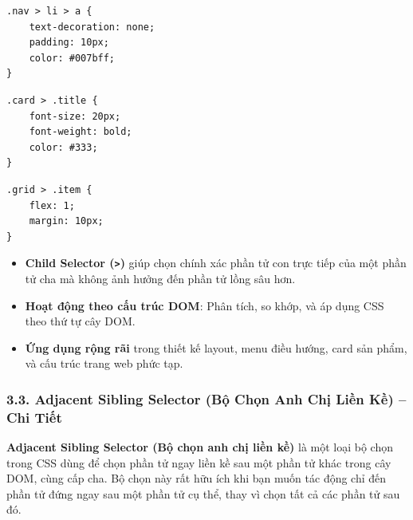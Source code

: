 \documentclass[11pt,oneside]{book}
\newcommand{\codeinline}[1]{\textcolor{accentOrange}{\texttt{#1}}}
\begin{document}
\begin{codeWindow}
\begin{lstlisting}[language=CSS3]
.nav > li > a {
    text-decoration: none;
    padding: 10px;
    color: #007bff;
}
\end{lstlisting}
\end{codeWindow}

\begin{codeWindow}
\begin{lstlisting}[language=CSS3]
.card > .title {
    font-size: 20px;
    font-weight: bold;
    color: #333;
}
\end{lstlisting}
\end{codeWindow}

\begin{codeWindow}
\begin{lstlisting}[language=CSS3]
.grid > .item {
    flex: 1;
    margin: 10px;
}
\end{lstlisting}
\end{codeWindow}

\begin{tipBox}
\begin{itemize}[leftmargin=1.5em, itemsep=3pt, parsep=0pt]
    \item \textbf{Child Selector (\codeinline{>})} giúp chọn chính xác phần tử con trực tiếp của một phần tử cha mà không ảnh hưởng đến phần tử lồng sâu hơn.
    \item \textbf{Hoạt động theo cấu trúc DOM}: Phân tích, so khớp, và áp dụng CSS theo thứ tự cây DOM.
    \item \textbf{Ứng dụng rộng rãi} trong thiết kế layout, menu điều hướng, card sản phẩm, và cấu trúc trang web phức tạp.
\end{itemize}
\end{tipBox}

\subsubsection{3.3. Adjacent Sibling Selector (Bộ Chọn Anh Chị Liền Kề) -- Chi Tiết}

\begin{conceptBox}
\textbf{Adjacent Sibling Selector (Bộ chọn anh chị liền kề)} là một loại bộ chọn trong CSS dùng để chọn phần tử ngay liền kề sau một phần tử khác trong cây DOM, cùng cấp cha. Bộ chọn này rất hữu ích khi bạn muốn tác động chỉ đến phần tử đứng ngay sau một phần tử cụ thể, thay vì chọn tất cả các phần tử sau đó.
\end{conceptBox}
\end{document}
